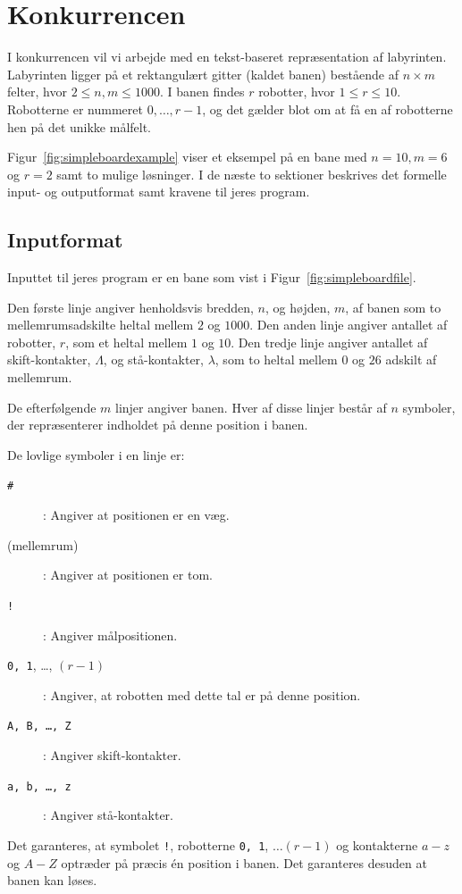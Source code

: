 \documentclass[10pt, a4paper]{article}
\begin{document}
\section{Konkurrencen}
I konkurrencen vil vi arbejde med en tekst-baseret repræsentation af labyrinten.
Labyrinten ligger på et rektangulært gitter (kaldet banen) bestående af $n \times m$ felter, hvor $2 \leq n,m \leq 1000$.
I banen findes $r$ robotter, hvor $1 \leq r \leq 10$. Robotterne er nummeret $0, \ldots, r-1$, og det gælder blot om at få en af robotterne hen på det unikke målfelt.

Figur~\ref{fig:simpleboardexample} viser et eksempel på en bane med $n=10, m=6$ og $r=2$ samt to mulige løsninger. I de næste to sektioner beskrives det formelle input- og outputformat samt kravene til jeres program.

\subsection{Inputformat}
Inputtet til jeres program er en bane som vist i Figur~\ref{fig:simpleboardfile}.

Den første linje angiver henholdsvis bredden,  $n$, og højden, $m$,  af banen som to mellemrumsadskilte heltal mellem $2$ og $1000$.
Den anden linje angiver antallet af robotter, $r$, som et heltal mellem $1$ og $10$.
Den tredje linje angiver antallet af skift-kontakter, $\Lambda$, og stå-kontakter, $\lambda$, som to heltal mellem $0$ og $26$ adskilt af mellemrum.

De efterfølgende $m$ linjer angiver banen.
Hver af disse linjer består af $n$ symboler, der repræsenterer indholdet på denne position i banen.

De lovlige symboler i en linje er:

\begin{description}
\item[\texttt{\#}]: Angiver at positionen er en væg.
\item[(mellemrum)]: Angiver at positionen er tom.
\item[\texttt{!}]: Angiver målpositionen.
\item[\texttt{0, 1}, \ldots, $(r-1)$]: Angiver, at robotten med dette tal er på denne position.
\item[\texttt{A, B, \ldots, Z}]: Angiver skift-kontakter.
\item[\texttt{a, b, \ldots, z}]: Angiver stå-kontakter.
\end{description}

Det garanteres, at symbolet \texttt{!}, robotterne \texttt{0, 1}, $\ldots (r-1)$ og kontakterne $a-z$ og $A-Z$ optræder på præcis én position i banen.
Det garanteres desuden at banen kan løses.
\end{document}
